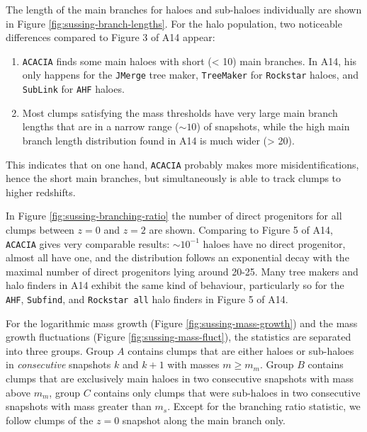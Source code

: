 The length of the main branches for haloes and sub-haloes individually are shown in Figure \ref{fig:sussing-branch-lengths}.
For the halo population, two noticeable differences compared to Figure 3 of A14 appear:
%
\begin{enumerate}
	\item \texttt{ACACIA} finds some main haloes with short (< 10) main branches.
	In A14, his only happens for the \texttt{JMerge} tree maker, \texttt{TreeMaker} for \texttt{Rockstar} haloes, and \texttt{SubLink} for \texttt{AHF} haloes. 
	\item Most clumps satisfying the mass thresholds have very large main branch lengths that are in a narrow range ($\sim 10$) of snapshots, while the high main branch length distribution found in A14 is much wider (> 20).
\end{enumerate}
%
This indicates that on one hand, \texttt{ACACIA} probably makes more misidentifications, hence the short main branches, but simultaneously is able to track clumps to higher redshifts.

In Figure \ref{fig:sussing-branching-ratio} the number of direct progenitors for all clumps between $z = 0$ and $z = 2$ are shown.
Comparing to Figure 5 of A14, \texttt{ACACIA} gives very comparable results:
$\sim 10^{-1}$ haloes have no direct progenitor, almost all have one, and the distribution follows an exponential decay with the maximal number of direct progenitors lying around 20-25.
Many tree makers and halo finders in A14 exhibit the same kind of behaviour, particularly so for the \texttt{AHF}, \texttt{Subfind}, and \texttt{Rockstar all} halo finders in Figure 5 of A14.



For the logarithmic mass growth (Figure \ref{fig:sussing-mass-growth}) and the mass growth fluctuations (Figure \ref{fig:sussing-mass-fluct}), the statistics are separated into three groups.
Group $A$ contains clumps that are either haloes or sub-haloes in \emph{consecutive} snapshots $k$ and $k+1$ with masses $m \geq m_{m}$.
Group $B$ contains clumps that are exclusively main haloes in two consecutive snapshots with mass above $m_{m}$, group $C$ contains only clumps that were sub-haloes in two consecutive snapshots with mass greater than $m_{s}$.
Except for the branching ratio statistic, we follow clumps of the $z = 0$ snapshot along the main branch only.

